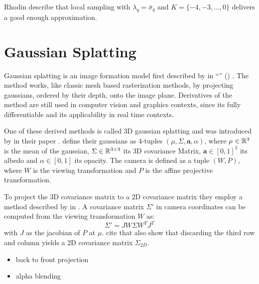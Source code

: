 \documentclass[a4paper, 11pt]{memoir}
\begin{document}
    Rhodin \etal describe that local sampling with $\lambda_q = \bar{\sigma}_q$ and
    $K = \{ -4, -3, \dots, 0 \}$ delivers a good enough approximation.

    \section{Gaussian Splatting}
    Gaussian splatting is an image formation model first described by \citeauthor{splatting} in \enquote{}
    (\citeyear{splatting}) \cite{splatting}. The method works, like classic mesh based rasterization methods, by projecting
    gaussians, ordered by their depth, onto the image plane. Derivatives of the method are still used in computer vision and graphics
    contexts, since its fully differentiable and its applicability in real time contexts.

    One of these derived methods is called 3D gaussian splatting and was introduced by \citeauthor{kerbl3Dgaussians} in their
    \citeyear{kerbl3Dgaussians} paper \cite{kerbl3Dgaussians}. \citeauthor{splatting} define their gaussians
    as 4-tuples $(\mu, \Sigma, \mathbf{a}, \alpha)$, where $\mu \in \mathbb{R}^3$ is the mean of the gaussian, $\Sigma \in \mathbb{R}^{3\times 3}$
    its 3D covariance Matrix, $\mathbf{a} \in [0, 1]^3$ its albedo and $\alpha \in [0, 1]$ its opacity. The camera is defined as a tuple
    $(W, P)$, where $W$ is the viewing transformation and $P$ is the affine projective transformation.

    To project the 3D covariance matrix to a 2D covariance matrix they employ a method described by \citeauthor{volume_splatting}
    in \cite{volume_splatting}. A covariance matrix $\Sigma'$ in camera coordinates can be computed
    from the viewing transformation $W$ as:
    \begin{equation}
        \Sigma' = JW\Sigma W^TJ^T
    \end{equation}
    with $J$ as the jacobian of $P$ at $\mu$. \citeauthor{kerbl3Dgaussians} cite that \citeauthor{volume_splatting} also show that discarding the third row and column yields
    a 2D covariance matrix $\Sigma_{2D}$.

    \begin{itemize}
        \item back to front projection
        \item alpha blending
    \end{itemize}
\end{document}
